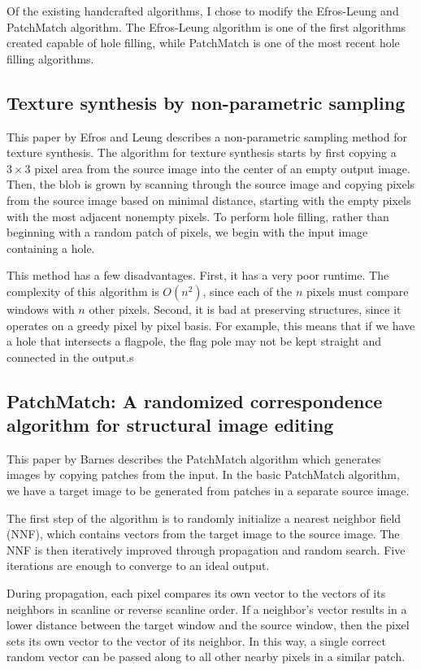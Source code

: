 Of the existing handcrafted algorithms, I chose to modify the Efros-Leung and PatchMatch algorithm. The Efros-Leung algorithm is one of the first algorithms created capable of hole filling, while PatchMatch is one of the most recent hole filling algorithms. 

\subsection*{Texture synthesis by non-parametric sampling \cite{efros1999texture}}

This paper by Efros and Leung describes a non-parametric sampling method for texture synthesis. The algorithm for texture synthesis starts by first copying a $3\times3$ pixel area from the source image into the center of an empty output image. Then, the blob is grown by scanning through the source image and copying pixels from the source image based on minimal distance, starting with the empty pixels with the most adjacent nonempty pixels. To perform hole filling, rather than beginning with a random patch of pixels, we begin with the input image containing a hole.

This method has a few disadvantages. First, it has a very poor runtime. The complexity of this algorithm is $O(n^2)$, since each of the $n$ pixels must compare windows with $n$ other pixels. Second, it is bad at preserving structures, since it operates on a greedy pixel by pixel basis. For example, this means that if we have a hole that intersects a flagpole, the flag pole may not be kept straight and connected in the output.s
\subsection*{PatchMatch: A randomized correspondence algorithm for structural image editing \cite{barnes2009patchmatch}}
This paper by Barnes \etal describes the PatchMatch algorithm which generates images by copying patches from the input. In the basic PatchMatch algorithm, we have a target image to be generated from patches in a separate source image.

The first step of the algorithm is to randomly initialize a nearest neighbor field (NNF), which contains vectors from the target image to the source image. The NNF is then iteratively improved through propagation and random search. Five iterations are enough to converge to an ideal output.

During propagation, each pixel compares its own vector to the vectors of its neighbors in scanline or reverse scanline order. If a neighbor's vector results in a lower distance between the target window and the source window, then the pixel sets its own vector to the vector of its neighbor. In this way, a single correct random vector can be passed along to all other nearby pixels in a similar patch.

